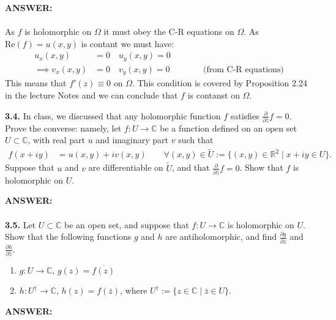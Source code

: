 \documentclass[12pt,a4paper]{article}
\begin{document}
\vspace{1cm}

\textbf{ANSWER:}\\
\\
As $f$ is holomorphic on $\Omega$ it must obey the C-R equations on $\Omega$.  As $\text{Re}(f) = u(x,y)$ is contant we must have:
\begin{align*}
    u_x(x,y) &= 0 \quad u_y(x,y) = 0 \\
    \implies v_x(x,y) &= 0 \quad v_y(x,y) = 0 \;\;\;\;\;\;\;\;\;\;\;\;\;\; \text{(from C-R equations)}
\end{align*}
This means that $f'(z) \equiv 0$ on $\Omega$.  This condition is covered by Proposition 2.24 in the lecture Notes
and we can conclude that $f$ is contanst on $\Omega$.

\newpage
\noindent\textbf{3.4.} In class, we discussed that any holomorphic function \(f\) satisfies \(\frac{\partial}{\partial\bar{z}}f=0\). Prove the converse: namely, let \(f:U\to\mathbb{C}\) be a function defined on an open set \(U\subset\mathbb{C}\), with real part \(u\) and imaginary part \(v\) such that
\begin{align*}
f(x+iy)&=u(x,y)+iv(x,y)\qquad \forall(x,y)\in\widetilde{U}:=\{(x,y)\in\mathbb{R}^2\mid x+iy\in U\}.
\end{align*}
Suppose that \(u\) and \(v\) are differentiable on \(\widetilde{U}\), and that \(\frac{\partial}{\partial\bar{z}}f=0\). Show that \(f\) is holomorphic on \(U\).

\vspace{1cm}

\textbf{ANSWER:}\\
\\

\newpage
\noindent\textbf{3.5.} Let \(U\subset\mathbb{C}\) be an open set, and suppose that \(f:U\to\mathbb{C}\) is holomorphic on \(U\). Show that the following functions \(g\) and \(h\) are antiholomorphic, and find \(\frac{\partial g}{\partial\bar{z}}\) and \(\frac{\partial h}{\partial\bar{z}}\).
\begin{enumerate}
\item[(i)] \(g:U\to\mathbb{C}\), \(g(z)=\overline{f(z)}\)
\item[(ii)] \(h:U^\dagger\to\mathbb{C}\), \(h(z)=f(\bar{z})\), where \(U^\dagger:=\{z\in\mathbb{C}\mid \bar{z}\in U\}\).
\end{enumerate}

\vspace{1cm}

\textbf{ANSWER:}\\
\\
\end{document}
